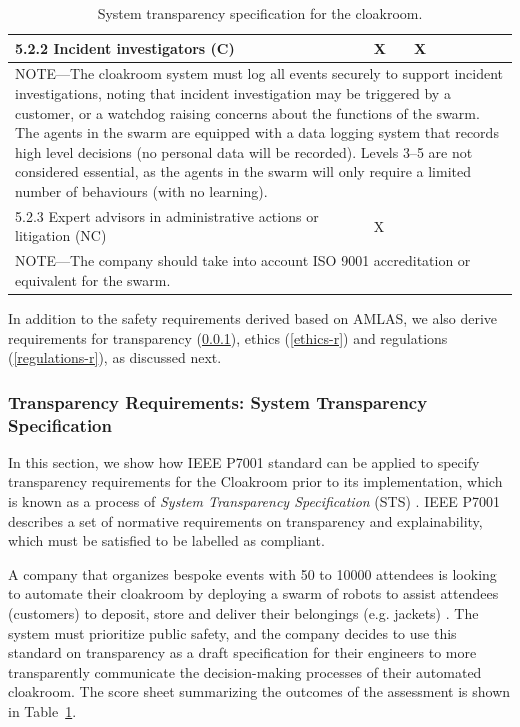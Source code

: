 \documentclass[lettersize,journal]{IEEEtran}
\begin{document}
\begin{table}[!t]
\begin{tabular}{|l| l| l| l| l| l|}
		5.2.2 Incident investigators (C) & X & X & & & \\ \hline
		\multicolumn{6}{|p{15cm}|}{NOTE—The cloakroom system must log all events securely to support incident investigations, noting that incident investigation may be triggered by a customer, or a watchdog raising concerns about the functions of the swarm. The agents in the swarm are equipped with a data logging system that records high level decisions (no personal data will be recorded). Levels 3--5 are not considered essential, as the agents in the swarm will only require a limited number of behaviours (with no learning).  }\\ \hline
		5.2.3 Expert advisors in administrative actions or litigation (NC) & X & & & & \\ \hline
		\multicolumn{6}{|p{15cm}|}{NOTE—The company should take into account ISO 9001 accreditation or equivalent for the swarm.}\\ \hline
	\end{tabular}
	\caption{\label{tab:transparency}System transparency specification for the cloakroom.}
\end{table}

In addition to the safety requirements derived based on AMLAS, we also derive requirements for transparency (\ref{transparency-r}), ethics (\ref{ethics-r}) and regulations (\ref{regulations-r}), as discussed next.\\

\subsubsection{Transparency Requirements: System Transparency Specification}\label{transparency-r}
In this section, we show how IEEE P7001 standard can be applied to specify transparency requirements for the Cloakroom prior to its implementation, which is known as a process of \textit{System Transparency Specification} (STS) \cite{IEEE-P7001}. IEEE P7001 describes a set of normative requirements on transparency and explainability, which must be satisfied to be labelled as compliant. %

A company that organizes bespoke events with 50 to 10000 attendees is looking to automate their cloakroom by deploying a swarm of robots to assist attendees (customers) to deposit, store and deliver their belongings (e.g. jackets) \cite{Jones2020}. %
The system must prioritize public safety, and the company decides to use this standard on transparency as a draft specification for their engineers to more transparently communicate the decision-making processes of their automated cloakroom. %
The score sheet summarizing the outcomes of the assessment is shown in Table~\ref{tab:transparency}. \\
\end{document}
